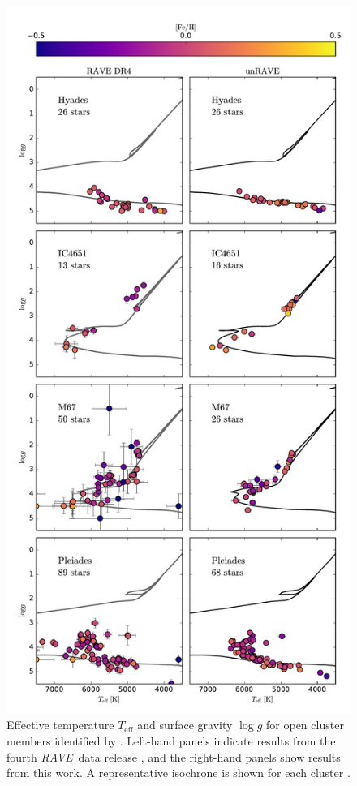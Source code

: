 \documentclass[preprint,trackchanges]{aastex}
\newcommand{\acronym}[1]{{\small{#1}}}
\newcommand{\project}[1]{\textsl{#1}}
\newcommand{\rave}{\project{\acronym{RAVE}}}
\newcommand{\teff}{T_{\mathrm{eff}}}
\newcommand{\logg}{\log g}
\begin{document}
\begin{figure}[p]
\center
\includegraphics[height=\textheight]{figures/open-clusters.pdf}
\caption{Effective temperature $\teff$ and surface gravity $\logg$ for open cluster members identified by \citep{Kunder_2016}.  Left-hand panels indicate results from the fourth \rave\ data release \citep{Kordopatis_2013}, and the right-hand panels show results from this work.  A representative isochrone is shown for each cluster \citep{Bressan_2012}.\label{fig:open-cluster-HRD}}
\end{figure}
\end{document}
